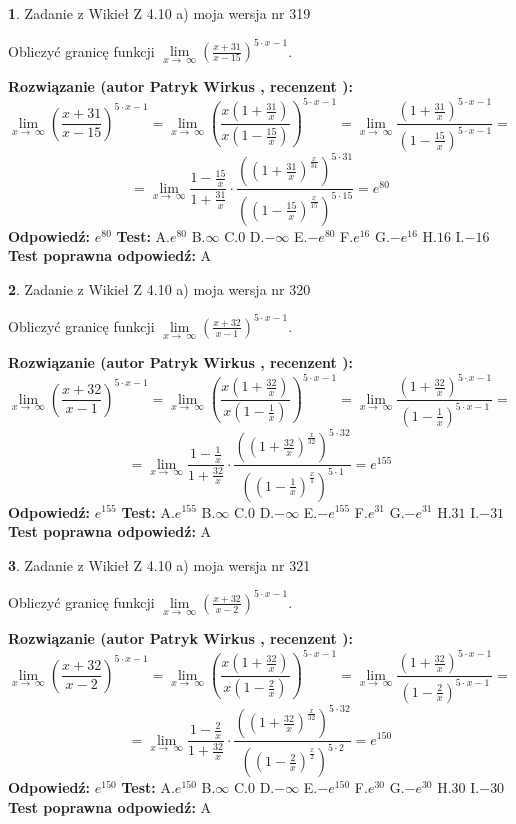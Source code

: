 \documentclass[12pt, a4paper]{article}
\theoremstyle{definition} %
\newtheorem{zad}{}
\newcommand{\zadStart}[1]{\begin{zad}#1\newline}
\newcommand{\zadStop}{\end{zad}}
\newcommand{\rozwStart}[2]{\noindent \textbf{Rozwiązanie (autor #1 , recenzent #2): }\newline}
\newcommand{\rozwStop}{\newline}
\newcommand{\odpStart}{\noindent \textbf{Odpowiedź:}\newline}
\newcommand{\odpStop}{\newline}
\newcommand{\testStart}{\noindent \textbf{Test:}\newline}
\newcommand{\testStop}{\newline}
\newcommand{\kluczStart}{\noindent \textbf{Test poprawna odpowiedź:}\newline}
\newcommand{\kluczStop}{\newline}
\begin{document}
\zadStart{Zadanie z Wikieł Z 4.10 a) moja wersja nr 319}

Obliczyć granicę funkcji  $\lim\limits_{x\to\ \infty}(\frac{x+31}{x-15})^{5\cdot x-1}$.
\zadStop
\rozwStart{Patryk Wirkus}{}
$$\lim\limits_{x\to\ \infty}(\frac{x+31}{x-15})^{5\cdot x-1} = \lim\limits_{x\to\ \infty}(\frac{x(1+\frac{31}{x})}{x(1-\frac{15}{x})})^{5\cdot x-1}=\lim\limits_{x\to\ \infty}\frac{(1+\frac{31}{x})^{5\cdot x-1}}{(1-\frac{15}{x})^{5\cdot x-1}}=$$
$$=\lim\limits_{x\to\ \infty}\frac{1-\frac{15}{x}}{1+\frac{31}{x}}\cdot\frac{((1+\frac{31}{x})^{\frac{x}{31}})^{5\cdot31}}{((1-\frac{15}{x})^{\frac{x}{15}})^{5\cdot15}}=e^{80}$$
\rozwStop
\odpStart
$e^{80}$
\odpStop
\testStart
A.$e^{80}$ B.$\infty$ C.$0$ D.$-\infty$ E.$-e^{80}$
F.$e^{16}$ G.$-e^{16}$
H.$16$
I.$-16$
\testStop
\kluczStart
A
\kluczStop



\zadStart{Zadanie z Wikieł Z 4.10 a) moja wersja nr 320}

Obliczyć granicę funkcji  $\lim\limits_{x\to\ \infty}(\frac{x+32}{x-1})^{5\cdot x-1}$.
\zadStop
\rozwStart{Patryk Wirkus}{}
$$\lim\limits_{x\to\ \infty}(\frac{x+32}{x-1})^{5\cdot x-1} = \lim\limits_{x\to\ \infty}(\frac{x(1+\frac{32}{x})}{x(1-\frac{1}{x})})^{5\cdot x-1}=\lim\limits_{x\to\ \infty}\frac{(1+\frac{32}{x})^{5\cdot x-1}}{(1-\frac{1}{x})^{5\cdot x-1}}=$$
$$=\lim\limits_{x\to\ \infty}\frac{1-\frac{1}{x}}{1+\frac{32}{x}}\cdot\frac{((1+\frac{32}{x})^{\frac{x}{32}})^{5\cdot32}}{((1-\frac{1}{x})^{\frac{x}{1}})^{5\cdot1}}=e^{155}$$
\rozwStop
\odpStart
$e^{155}$
\odpStop
\testStart
A.$e^{155}$ B.$\infty$ C.$0$ D.$-\infty$ E.$-e^{155}$
F.$e^{31}$ G.$-e^{31}$
H.$31$
I.$-31$
\testStop
\kluczStart
A
\kluczStop



\zadStart{Zadanie z Wikieł Z 4.10 a) moja wersja nr 321}

Obliczyć granicę funkcji  $\lim\limits_{x\to\ \infty}(\frac{x+32}{x-2})^{5\cdot x-1}$.
\zadStop
\rozwStart{Patryk Wirkus}{}
$$\lim\limits_{x\to\ \infty}(\frac{x+32}{x-2})^{5\cdot x-1} = \lim\limits_{x\to\ \infty}(\frac{x(1+\frac{32}{x})}{x(1-\frac{2}{x})})^{5\cdot x-1}=\lim\limits_{x\to\ \infty}\frac{(1+\frac{32}{x})^{5\cdot x-1}}{(1-\frac{2}{x})^{5\cdot x-1}}=$$
$$=\lim\limits_{x\to\ \infty}\frac{1-\frac{2}{x}}{1+\frac{32}{x}}\cdot\frac{((1+\frac{32}{x})^{\frac{x}{32}})^{5\cdot32}}{((1-\frac{2}{x})^{\frac{x}{2}})^{5\cdot2}}=e^{150}$$
\rozwStop
\odpStart
$e^{150}$
\odpStop
\testStart
A.$e^{150}$ B.$\infty$ C.$0$ D.$-\infty$ E.$-e^{150}$
F.$e^{30}$ G.$-e^{30}$
H.$30$
I.$-30$
\testStop
\kluczStart
A
\kluczStop
\end{document}
